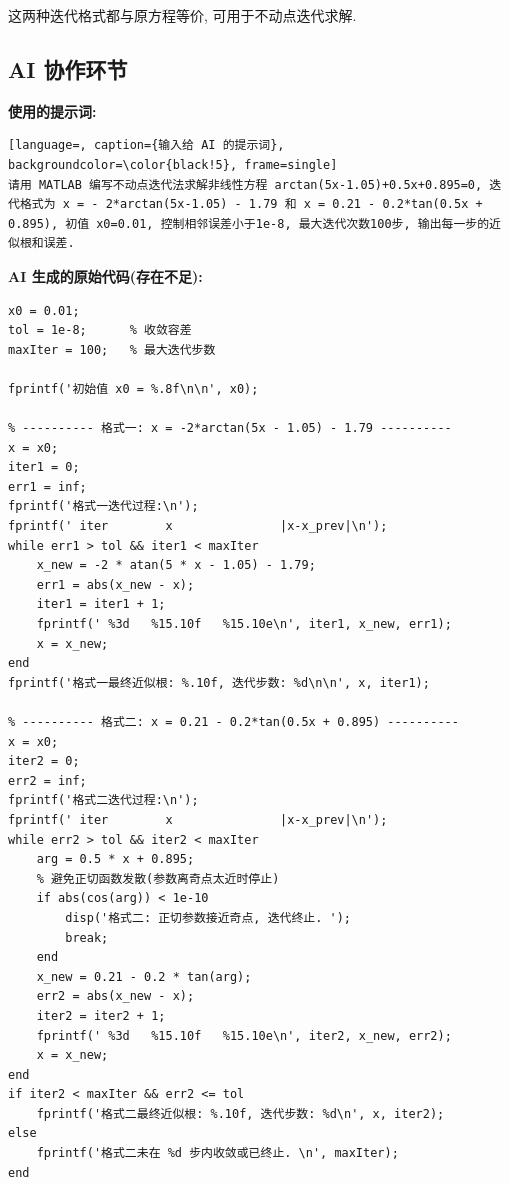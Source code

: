 \documentclass[zihao=-4,a4paper]{ctexart}
\begin{document}
这两种迭代格式都与原方程等价, 可用于不动点迭代求解. 

\subsection{AI 协作环节}
\textbf{使用的提示词: }
\begin{center}
  \begin{minipage}{0.9\textwidth}
    \begin{lstlisting}[language=, caption={输入给 AI 的提示词}, backgroundcolor=\color{black!5}, frame=single]
请用 MATLAB 编写不动点迭代法求解非线性方程 arctan(5x-1.05)+0.5x+0.895=0, 迭代格式为 x = - 2*arctan(5x-1.05) - 1.79 和 x = 0.21 - 0.2*tan(0.5x + 0.895), 初值 x0=0.01, 控制相邻误差小于1e-8, 最大迭代次数100步, 输出每一步的近似根和误差. 
  \end{lstlisting}
  \end{minipage}
\end{center}


\textbf{AI 生成的原始代码(存在不足): }
\begin{lstlisting}[caption={AI 原始代码}, label=code:ai_raw]
% 定义两种迭代格式, 初值 x0 = 0.01
x0 = 0.01;
tol = 1e-8;      % 收敛容差
maxIter = 100;   % 最大迭代步数

fprintf('初始值 x0 = %.8f\n\n', x0);

% ---------- 格式一: x = -2*arctan(5x - 1.05) - 1.79 ----------
x = x0;
iter1 = 0;
err1 = inf;
fprintf('格式一迭代过程:\n');
fprintf(' iter        x               |x-x_prev|\n');
while err1 > tol && iter1 < maxIter
    x_new = -2 * atan(5 * x - 1.05) - 1.79;
    err1 = abs(x_new - x);
    iter1 = iter1 + 1;
    fprintf(' %3d   %15.10f   %15.10e\n', iter1, x_new, err1);
    x = x_new;
end
fprintf('格式一最终近似根: %.10f, 迭代步数: %d\n\n', x, iter1);

% ---------- 格式二: x = 0.21 - 0.2*tan(0.5x + 0.895) ----------
x = x0;
iter2 = 0;
err2 = inf;
fprintf('格式二迭代过程:\n');
fprintf(' iter        x               |x-x_prev|\n');
while err2 > tol && iter2 < maxIter
    arg = 0.5 * x + 0.895;
    % 避免正切函数发散(参数离奇点太近时停止) 
    if abs(cos(arg)) < 1e-10
        disp('格式二: 正切参数接近奇点, 迭代终止. ');
        break;
    end
    x_new = 0.21 - 0.2 * tan(arg);
    err2 = abs(x_new - x);
    iter2 = iter2 + 1;
    fprintf(' %3d   %15.10f   %15.10e\n', iter2, x_new, err2);
    x = x_new;
end
if iter2 < maxIter && err2 <= tol
    fprintf('格式二最终近似根: %.10f, 迭代步数: %d\n', x, iter2);
else
    fprintf('格式二未在 %d 步内收敛或已终止. \n', maxIter);
end
\end{lstlisting}
\end{document}
